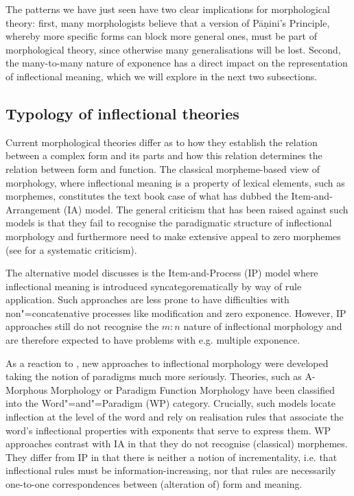 \documentclass[output=paper
	        ,collection
	        ,collectionchapter
 	        ,biblatex
                ,babelshorthands
                ,newtxmath
                ,draftmode
                ,colorlinks, citecolor=brown
]{langscibook}
\begin{document}
The patterns we have just seen have two clear implications for
morphological theory: first, many morphologists believe that
a version of Pāṇini's Principle, whereby more specific forms can block
more general ones, must be part of morphological theory, since
otherwise many generalisations will be lost. 
Second, the many-to-many nature of exponence has a direct impact on
the representation of inflectional meaning, which we will explore in
the next two subsections. 

\subsection{Typology of inflectional theories}
\label{sec:InflTypology}

Current morphological theories differ as to how they establish the
relation between a complex form and its parts and how this relation
determines the relation between form and function. The classical
morpheme-based view of morphology, where inflectional meaning is a
property of lexical elements, such as morphemes, constitutes the text
book case of what \cite{Hockett54} has dubbed the Item-and-Arrangement
(IA) model.  The general criticism that has been raised against such
models is that they fail to recognise the paradigmatic structure of
inflectional morphology and furthermore need to make extensive appeal
to zero morphemes (see \citealp{Anderson92} for a systematic
criticism).

The alternative model \citet{Hockett54} discusses is the
Item-and-Process (IP) model where inflectional meaning is introduced
syncategorematically by way of rule application. Such approaches
are less prone to have difficulties with non"=concatenative processes
like modification and zero exponence. However, IP approaches still do
not recognise the $m:n$ nature of inflectional morphology and are
therefore expected to have problems with e.g. multiple exponence. 


As a reaction to \citet{Matthews72}, new approaches to inflectional
morphology were developed taking the notion of paradigms much more
seriously. Theories, such as A-Morphous Morphology \citep{Anderson92}
or Paradigm Function Morphology \citep{Stump01} have been classified
into the Word"=and"=Paradigm (WP) category. Crucially, such models
locate inflection at the level of the word and rely on realisation
rules that associate the word's inflectional properties with exponents
that serve to express them. WP approaches contrast with IA in that
they do not recognise (classical) morphemes. They differ from IP in
that there is neither a notion of incrementality, i.e. that
inflectional rules must be information-increasing, nor that rules are
necessarily one-to-one correspondences between (alteration of) form
and meaning.
\end{document}
